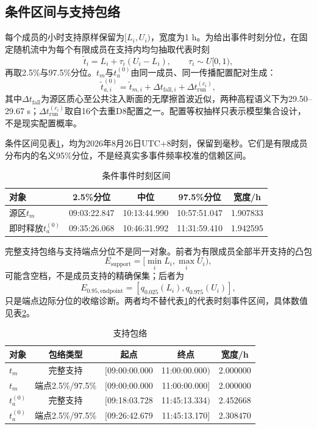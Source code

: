 \subsection{条件区间与支持包络}
每个成员的小时支持原样保留为$[L_i,U_i)$，宽度为1 h。为给出事件时刻分位，在固定随机流中为每个有限成员在支持内均匀抽取代表时刻
\begin{equation}
\tilde t_i=L_i+\tau_i(U_i-L_i),\qquad \tau_i\sim U[0,1),
\end{equation}
再取2.5\%与97.5\%分位。$t_m$与$t_a^{(0)}$由同一成员、同一传播配置配对生成：
\begin{equation}
\tilde t_{a,i}^{(0)}=\tilde t_{m,i}+\Delta t_{\mathrm{fall},i}
+\Delta t_{\mathrm{run}}^{(c_i)},
\end{equation}
其中$\Delta t_{\mathrm{fall}}$为源区质心至公共注入断面的无摩擦首波近似，两种高程语义下为29.50--29.67 s；$\Delta t_{\mathrm{run}}^{(c_i)}$取自16个去重D8配置之一。配置等权抽样只表示模型集合设计，不是现实配置概率。

条件区间见表\ref{tab:q3-event-intervals}，均为2026年8月26日UTC+8时刻，保留到毫秒。它们是有限成员分布内的名义95\%分位，不是经真实多事件频率校准的信赖区间。

\begin{table}[htbp]\centering\footnotesize
\caption{条件事件时刻区间}\label{tab:q3-event-intervals}
\begin{tabular}{@{}l c c c c@{}}\toprule
对象&2.5\%分位&中位&97.5\%分位&宽度/h\\\midrule
源区$t_m$&09:03:22.847&10:13:44.990&10:57:51.047&1.907833\\
即时释放$t_a^{(0)}$&09:35:26.068&10:46:31.992&11:31:59.410&1.942595\\
\bottomrule
\end{tabular}\end{table}

完整支持包络与支持端点分位不是同一对象。前者为有限成员全部半开支持的凸包
\begin{equation}
E_{\mathrm{support}}=[\min_i L_i,\max_i U_i),
\end{equation}
可能含空档，不是成员支持的精确保集；后者为
\begin{equation}
E_{0.95,\mathrm{endpoint}}=[q_{0.025}(L_i),q_{0.975}(U_i)],
\end{equation}
只是端点边际分位的收缩诊断。两者均不替代表\ref{tab:q3-event-intervals}的代表时刻事件区间，具体数值见表\ref{tab:q3-envelopes}。

\begin{table}[htbp]\centering\footnotesize
\caption{支持包络}\label{tab:q3-envelopes}
\begin{tabular}{@{}l c c c c@{}}\toprule
对象&包络类型&起点&终点&宽度/h\\\midrule
$t_m$&完整支持&$[$09:00:00.000&11:00:00.000$)$&2.000000\\
$t_m$&端点2.5\%/97.5\%&$[$09:00:00.000&11:00:00.000$]$&2.000000\\
$t_a^{(0)}$&完整支持&$[$09:18:03.728&11:45:13.334$)$&2.452668\\
$t_a^{(0)}$&端点2.5\%/97.5\%&$[$09:26:42.679&11:45:13.170$]$&2.308470\\
\bottomrule
\end{tabular}\end{table}

